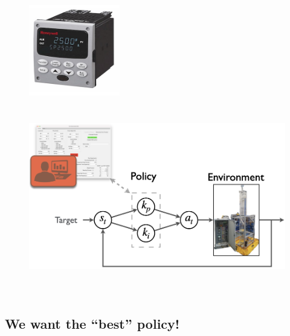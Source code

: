 \documentclass[
  letterpaper,
  DIV=11,
  numbers=noendperiod,
  oneside]{scrartcl}
\begin{document}
\begin{figure}

\begin{minipage}{0.20\linewidth}
\begin{center}
\includegraphics[width=\textwidth,height=1.5625in]{figs/Honey_UDC.jpg}
\end{center}
\end{minipage}%
%
\begin{minipage}{0.80\linewidth}
\begin{center}
\includegraphics[width=\textwidth,height=3.38542in]{figs/rl-pid.png}
\end{center}
\end{minipage}%

\end{figure}%


\subsection{We want the ``best'' policy!}\label{we-want-the-best-policy}
\end{document}
